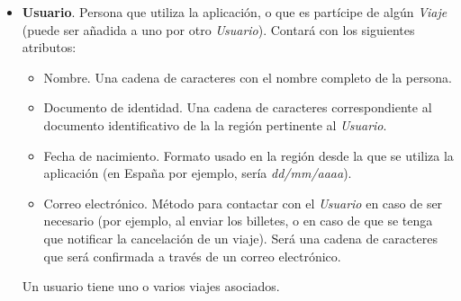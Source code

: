 \begin{itemize}
    \item \textbf{Usuario}. Persona que utiliza la aplicación, o que es partícipe de algún \textit{Viaje} (puede ser
        añadida a uno por otro \textit{Usuario}). Contará con los siguientes atributos:
        \begin{itemize}
            \item Nombre. Una cadena de caracteres con el nombre completo de la persona.
            \item Documento de identidad. Una cadena de caracteres correspondiente al documento identificativo de la
                la región pertinente al \textit{Usuario}.
            \item Fecha de nacimiento. Formato usado en la región desde la que se utiliza la aplicación (en España por ejemplo,
                sería \textit{dd/mm/aaaa}).
            \item Correo electrónico. Método para contactar con el \textit{Usuario} en caso de ser necesario (por ejemplo, al
                enviar los billetes, o en caso de que se tenga que notificar la cancelación de un viaje). Será una cadena de
                caracteres que será confirmada a través de un correo electrónico.
        \end{itemize}
        Un usuario tiene uno o varios viajes asociados.

\end{itemize}
